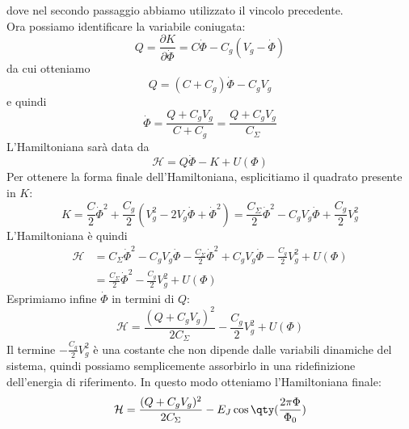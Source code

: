 dove nel secondo passaggio abbiamo utilizzato il vincolo precedente.\\
Ora possiamo identificare la variabile coniugata:
\begin{equation*}
    Q
    =\frac{\partial K}{\partial \dot{\Phi}}
    =C \dot{\Phi} - C_g (V_g - \dot{\Phi})
\end{equation*}
da cui otteniamo
\begin{equation*}
    Q=(C + C_g)\dot{\Phi} -C_g V_g
\end{equation*}
e quindi
\begin{equation*}
    \dot{\Phi}
    =\frac{Q + C_g V_g}{C + C_g}
    =\frac{Q + C_g V_g}{C_{\Sigma}}
\end{equation*}
L'Hamiltoniana sarà data da
\begin{equation*}
    \mathcal{H}
    =Q \dot{\Phi} - K + U(\Phi)
\end{equation*}
Per ottenere la forma finale dell'Hamiltoniana, esplicitiamo il quadrato presente in $K$:
\begin{equation*}
    K
    =\frac{C}{2} \dot{\Phi}^2 + \frac{C_g}{2} (V_g^2 - 2 V_g \dot{\Phi} + \dot{\Phi}^2)
    =\frac{C_{\Sigma}}{2} \dot{\Phi}^2 - C_g V_g \dot{\Phi} + \frac{C_g}{2} V_g^2
\end{equation*}
L'Hamiltoniana è quindi
\begin{equation*}
    \begin{split}
        \mathcal{H}
        & =C_{\Sigma}\dot{\Phi}^2 - C_g V_g \dot{\Phi} - \frac{C_{\Sigma}}{2} \dot{\Phi}^2 + C_g V_g \dot{\Phi} - \frac{C_g}{2} V_g^2 + U(\Phi)
        \\
        & =\frac{C_{\Sigma}}{2} \dot{\Phi}^2 - \frac{C_g}{2} V_g^2 + U(\Phi)
    \end{split}
\end{equation*}
Esprimiamo infine $\dot{\Phi}$ in termini di $Q$:
\begin{equation*}
    \mathcal{H}
    =\frac{(Q + C_g V_g)^2}{2 C_{\Sigma}} - \frac{C_g}{2} V_g^2 + U(\Phi)
\end{equation*}
Il termine $-\frac{C_g}{2} V_g^2$ è una costante che non dipende dalle variabili dinamiche del sistema, quindi possiamo semplicemente assorbirlo in una ridefinizione dell'energia di riferimento. In questo modo otteniamo l'Hamiltoniana finale:
\begin{equation*}
    \mathcal{H}
    =\frac{(Q + C_g V_g)^2}{2 C_{\Sigma}} - E_J \cos{ \qty( \frac{2 \pi \Phi}{\Phi_0} )}
\end{equation*}
